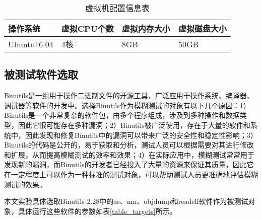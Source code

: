 \documentclass[master]{thesis-uestc}
\begin{document}
\begin{table}[!htbp]
    \caption{虚拟机配置信息表}
    \begin{tabular}{llll}
    \toprule
    操作系统 & 虚拟CPU个数 & 虚拟内存大小 & 虚拟磁盘大小 \\
    \midrule
    Ubuntu16.04 & 4核 & 8GB & 50GB \\
    \bottomrule
    \end{tabular}
    \label{table_kvm}
    \vspace{6pt}
\end{table}

\subsection{被测试软件选取}

Binutils是一组用于操作二进制文件的开源工具，广泛应用于操作系统、编译器、调试器等软件的开发中。选择Binutils作为模糊测试的对象有以下几个原因：1）Binutils是一个非常复杂的软件包，由多个程序组成，涉及到多种操作和数据类型，因此它很可能存在多种漏洞；2）Binutils被广泛使用，存在于大量的软件和系统中，因此发现和修复Binutils中的漏洞可以带来广泛的安全性和稳定性影响；3）Binutils的代码是公开的，易于获取和分析，测试人员可以根据需要对其进行修改和扩展，从而提高模糊测试的效率和效果；4）在实际应用中，模糊测试常常用于发现新的漏洞，而Binutils的开发者已经投入了大量的资源来保证其质量，因此它在一定程度上可以作为一种标准的测试对象，可以帮助测试人员更准确地评估模糊测试的效果。

本文实验具体选取Binutils-2.28中的as、nm、objdump和readelf软件作为被测试对象，具体运行这些软件的参数如表\ref{table_targets}所示。
\end{document}
